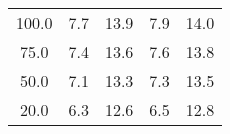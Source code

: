 \begin{tabular}{ccccc}
\hline
100.0 & 7.7 & 13.9 & 7.9 & 14.0 \\
75.0 & 7.4 & 13.6 & 7.6 & 13.8 \\
50.0 & 7.1 & 13.3 & 7.3 & 13.5 \\
20.0 & 6.3 & 12.6 & 6.5 & 12.8 \\
\hline
\end{tabular}
